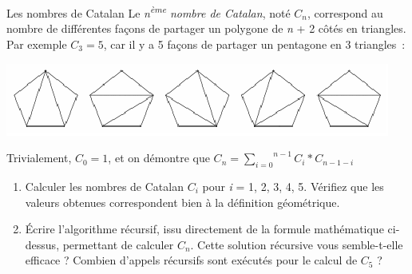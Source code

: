 	\begin{Exercice}{Les nombres de Catalan}
		Le \textit{n\textsuperscript{ème}} \textit{nombre de Catalan}, 
		noté $C_n$, correspond au nombre de différentes façons de 
		partager un polygone de \textit{n} + 2 côtés en triangles. 
		Par exemple $C_3=5$, car il y a 5 façons de partager un 
		pentagone en 3 triangles~:

		\begin{center}
		\includegraphics[width=12.659cm,height=2.387cm]{image/a2012Logique2eme-img027.png}
		\end{center}

		Trivialement, $C_0=1$, et on démontre que 
		$C_n=\overset{n-1}{\underset{i=0}{\sum }}C_i\ast C_{n-1-i}$

		\setcounter{saveenum}{\value{enumi}}
		\begin{enumerate}
			\item {
				Calculer les nombres de Catalan $C_i$ pour \textit{i} = 1, 2, 3, 4, 5. 
				Vérifiez que les valeurs obtenues correspondent bien à la 
				définition géométrique.}
			\item {
				Écrire l'algorithme récursif, issu directement de la formule 
				mathématique ci-dessus, permettant de calculer $C_n$. 
				Cette solution récursive vous semble-t-elle efficace ? 
				Combien d'appels récursifs sont exécutés pour le calcul 
				de $C_5$ ?}
		\end{enumerate}
	\end{Exercice}


